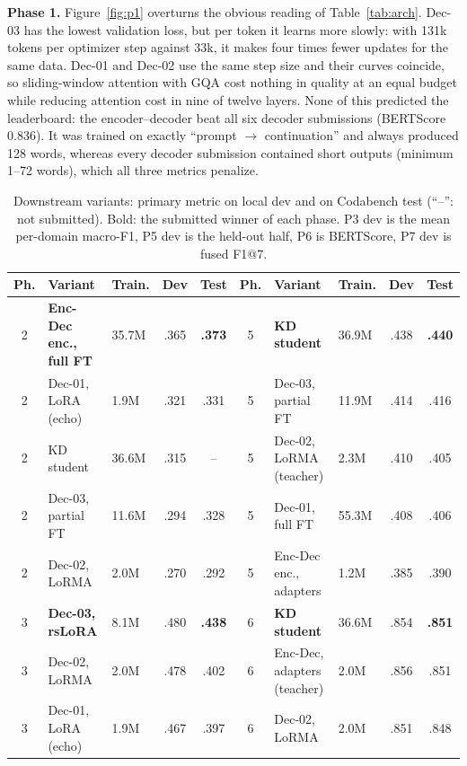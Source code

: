 \documentclass[11pt, oneside]{article}
\begin{document}
\textbf{Phase 1.} Figure~\ref{fig:p1} overturns the obvious reading of Table~\ref{tab:arch}. Dec-03 has the lowest validation loss, but per token it learns more slowly: with 131k tokens per optimizer step against 33k, it makes four times fewer updates for the same data. Dec-01 and Dec-02 use the same step size and their curves coincide, so sliding-window attention with GQA cost nothing in quality at an equal budget while reducing attention cost in nine of twelve layers. None of this predicted the leaderboard: the encoder--decoder beat all six decoder submissions (BERTScore 0.836). It was trained on exactly ``prompt $\to$ continuation'' and always produced 128 words, whereas every decoder submission contained short outputs (minimum 1--72 words), which all three metrics penalize.

\begin{table}[t]
\centering
\footnotesize
\caption{Downstream variants: primary metric on local dev and on Codabench test (``--'': not submitted). Bold: the submitted winner of each phase. P3 dev is the mean per-domain macro-F1, P5 dev is the held-out half, P6 is BERTScore, P7 dev is fused F1@7.}
\label{tab:variants}
\setlength{\tabcolsep}{3pt}
\begin{tabular}{@{}cllcc@{\hspace{8pt}}cllcc@{}}
\toprule
Ph. & Variant & Train. & Dev & Test & Ph. & Variant & Train. & Dev & Test \\
\midrule
2 & \textbf{Enc-Dec enc., full FT} & 35.7M & .365 & \textbf{.373} & 5 & \textbf{KD student} & 36.9M & .438 & \textbf{.440} \\
2 & Dec-01, LoRA (echo) & 1.9M & .321 & .331 & 5 & Dec-03, partial FT & 11.9M & .414 & .416 \\
2 & KD student & 36.6M & .315 & -- & 5 & Dec-02, LoRMA (teacher) & 2.3M & .410 & .405 \\
2 & Dec-03, partial FT & 11.6M & .294 & .328 & 5 & Dec-01, full FT & 55.3M & .408 & .406 \\
2 & Dec-02, LoRMA & 2.0M & .270 & .292 & 5 & Enc-Dec enc., adapters & 1.2M & .385 & .390 \\
\cmidrule(r{10pt}){1-5}\cmidrule{6-10}
3 & \textbf{Dec-03, rsLoRA} & 8.1M & .480 & \textbf{.438} & 6 & \textbf{KD student} & 36.6M & .854 & \textbf{.851} \\
3 & Dec-02, LoRMA & 2.0M & .478 & .402 & 6 & Enc-Dec, adapters (teacher) & 2.0M & .856 & .851 \\
3 & Dec-01, LoRA (echo) & 1.9M & .467 & .397 & 6 & Dec-02, LoRMA & 2.0M & .851 & .848 \\

\end{tabular}
\end{table}
\end{document}

